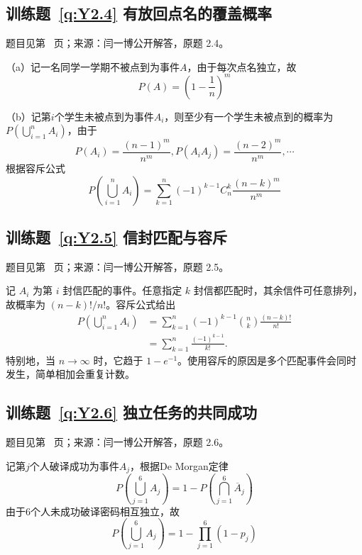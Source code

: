 \subsection*{训练题~\ref{q:Y2.4} 有放回点名的覆盖概率}\label{a:Y2.4}{\small 题目见第~\pageref{q:Y2.4} 页；来源：闫一博公开解答，原题 2.4。}
\begin{solve}
（a）记一名同学一学期不被点到为事件$A$，由于每次点名独立，故
\[P(A) = {\left( {1 - \frac{1}{n}} \right)^m}\]

（b）记第$i$个学生未被点到为事件$A_i$，则至少有一个学生未被点到的概率为$P(\bigcup\limits_{i = 1}^n {{A_i}})$，由于\[P({A_i}) = \frac{{{{(n - 1)}^m}}}{{{n^m}}},P({A_i}{A_j}) = \frac{{{{(n - 2)}^m}}}{{{n^m}}}, \cdots \]根据容斥公式
\[P(\bigcup\limits_{i = 1}^n {{A_i}} ) = \sum\limits_{k = 1}^n {{{( - 1)}^{k - 1}}} C_n^k\frac{{{{(n - k)}^m}}}{{{n^m}}}\]
\end{solve}

\subsection*{训练题~\ref{q:Y2.5} 信封匹配与容斥}\label{a:Y2.5}{\small 题目见第~\pageref{q:Y2.5} 页；来源：闫一博公开解答，原题 2.5。}
\begin{solve}记 $A_i$ 为第 $i$ 封信匹配的事件。任意指定 $k$ 封信都匹配时，其余信件可任意排列，故概率为 $(n-k)!/n!$。容斥公式给出\[\begin{aligned}P\left(\bigcup_{i=1}^nA_i\right)&=\sum_{k=1}^n(-1)^{k-1}\binom nk\frac{(n-k)!}{n!}\\&=\sum_{k=1}^n\frac{(-1)^{k-1}}{k!}.\end{aligned}\]特别地，当 $n\to\infty$ 时，它趋于 $1-e^{-1}$。使用容斥的原因是多个匹配事件会同时发生，简单相加会重复计数。\end{solve}

\subsection*{训练题~\ref{q:Y2.6} 独立任务的共同成功}\label{a:Y2.6}{\small 题目见第~\pageref{q:Y2.6} 页；来源：闫一博公开解答，原题 2.6。}
\begin{solve}
记第$j$个人破译成功为事件$A_j$，根据De Morgan定律
\[P(\bigcup\limits_{j = 1}^6 {{A_j}} ) = 1 - P(\bigcap\limits_{j = 1}^6 {{{\overline A }_j}} )\]
由于$6$个人未成功破译密码相互独立，故
\[P(\bigcup\limits_{j = 1}^6 {{A_j}} ) = 1 - \prod\limits_{j = 1}^6 {(1 - {p_j})} \]
\end{solve}

